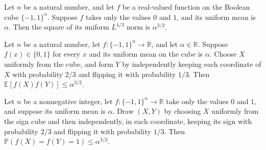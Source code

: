 \begin{theorem}
\label{FABL.uniformLpNorm_fourThird_sq_of_zeroOne}
\leanok
{}
Let $n$ be a natural number, and let $f$ be a real-valued function on the Boolean cube
$\{-1,1\}^n$. Suppose $f$ takes only the values $0$ and $1$, and its uniform mean is
$\alpha$. Then the square of its uniform $L^{4/3}$ norm is $\alpha^{3/2}$.
\end{theorem}

\begin{theorem}
\label{FABL.smallSetExpansion_oneThird}
\leanok
{}
Let $n$ be a natural number, let $f:\{-1,1\}^n\to\mathbb R$, and let $\alpha\in\mathbb
R$. Suppose $f(x)\in\{0,1\}$ for every $x$ and its uniform mean on the cube is $\alpha$.
Choose $X$ uniformly from the cube, and form $Y$ by independently keeping each
coordinate of $X$ with probability $2/3$ and flipping it with probability $1/3$. Then
$\mathbb E[f(X)f(Y)]\leq \alpha^{3/2}$.
\end{theorem}

\begin{theorem}
\label{FABL.smallSetExpansion_oneThird_event}
\leanok
{}
Let $n$ be a nonnegative integer, let $f:\{-1,1\}^n\to\mathbb R$ take only the values
$0$ and $1$, and suppose its uniform mean is $\alpha$. Draw $(X,Y)$ by choosing $X$
uniformly from the sign cube and then independently, in each coordinate, keeping its
sign with probability $2/3$ and flipping it with probability $1/3$. Then $\mathbb
P(f(X)=f(Y)=1)\le\alpha^{3/2}$.
\end{theorem}

